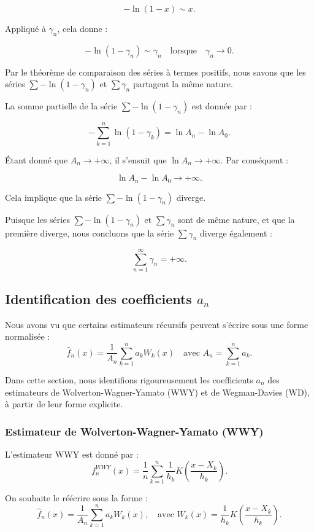 \documentclass[12pt]{article}
\begin{document}
\[
-\ln(1 - x) \sim x.
\]

Appliqué à \( \gamma_n \), cela donne :

\[
-\ln(1 - \gamma_n) \sim \gamma_n \quad \text{lorsque} \quad \gamma_n \to 0.
\]

Par le théorème de comparaison des séries à termes positifs, nous savons que les séries \( \sum -\ln(1 - \gamma_n) \) et \( \sum \gamma_n \) partagent la même nature.

La somme partielle de la série \( \sum -\ln(1 - \gamma_n) \) est donnée par :

\[
-\sum_{k=1}^n \ln(1 - \gamma_k) = \ln A_n - \ln A_0.
\]

Étant donné que \( A_n \to +\infty \), il s'ensuit que \( \ln A_n \to +\infty \). Par conséquent :

\[
\ln A_n - \ln A_0 \to +\infty.
\]

Cela implique que la série \( \sum -\ln(1 - \gamma_n) \) diverge.

Puisque les séries \( \sum -\ln(1 - \gamma_n) \) et \( \sum \gamma_n \) sont de même nature, et que la première diverge, nous concluons que la série \( \sum \gamma_n \) diverge également :

\[
\sum_{n=1}^{\infty} \gamma_n = +\infty.
\]




\subsection{Identification  des coefficients \( a_n \)}

Nous avons vu que certains estimateurs récursifs peuvent s’écrire sous une forme normalisée :
\[
\hat{f}_n(x) = \frac{1}{A_n} \sum_{k=1}^n a_k W_k(x)
\quad \text{avec } A_n = \sum_{k=1}^n a_k.
\]

Dans cette section, nous identifions rigoureusement les coefficients \( a_n \) des estimateurs de Wolverton-Wagner-Yamato (WWY) et de Wegman-Davies (WD), à partir de leur forme explicite.

\subsubsection*{Estimateur de Wolverton-Wagner-Yamato (WWY)}

L’estimateur WWY est donné par :
\[
f_n^{WWY}(x) = \frac{1}{n} \sum_{k=1}^{n} \frac{1}{h_k} K\left( \frac{x - X_k}{h_k} \right).
\]

On souhaite le réécrire sous la forme :
\[
\hat{f}_n(x) = \frac{1}{A_n} \sum_{k=1}^n a_k W_k(x),
\quad \text{avec } W_k(x) = \frac{1}{h_k} K\left( \frac{x - X_k}{h_k} \right).
\]
\end{document}
